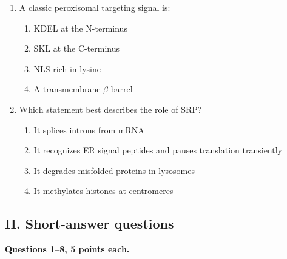 \documentclass[12pt,fontset=none]{ctexart}
\begin{document}
\begin{enumerate}
\item A classic peroxisomal targeting signal is:
\begin{enumerate}[label=\alph*.]
\item KDEL at the N-terminus
\item SKL at the C-terminus
\item NLS rich in lysine
\item A transmembrane $\beta$-barrel
\end{enumerate}

\item Which statement best describes the role of SRP?
\begin{enumerate}[label=\alph*.]
\item It splices introns from mRNA
\item It recognizes ER signal peptides and pauses translation transiently
\item It degrades misfolded proteins in lysosomes
\item It methylates histones at centromeres
\end{enumerate}
\end{enumerate}

\subsection*{II. Short-answer questions}
\textbf{Questions 1--8, 5 points each.}
\end{document}
